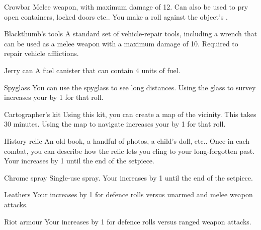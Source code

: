 \hr

\begin{describe}{Crowbar}
  Melee weapon, with maximum damage of 12. Can also be used to pry open containers, locked doors etc.. You make a \stat{\statPhysical} roll against the object's .
\end{describe}

\begin{describe}{Blackthumb's tools}
  A standard set of vehicle-repair tools, including a wrench that can be used as a melee weapon with a maximum damage of 10. Required to repair vehicle afflictions.
\end{describe}

\begin{describe}{Jerry can}
  A fuel canister that can contain 4 units of fuel.
\end{describe}

\begin{describe}{Spyglass}
  You can use the spyglass to see long distances. Using the glass to survey increases your \stat{\statMental} by 1 for that roll.
\end{describe}

\begin{describe}{Cartographer's kit}
  Using this kit, you can create a map of the vicinity. This takes 30 minutes. Using the map to navigate increases your \stat{\statMental} by 1 for that roll.
\end{describe}

\begin{describe}{History relic}
  An old book, a handful of photos, a child's doll, etc.. Once in each combat, you can describe how the relic lets you cling to your long-forgotten past. Your \stat{\statSkill} increases by 1 until the end of the setpiece.
\end{describe}

\begin{describe}{Chrome spray}
  Single-use spray. Your \stat{\statPhysical} increases by 1 until the end of the setpiece.
\end{describe}

\hr

\begin{describe}{Leathers}
  Your \stat{\statSkill} increases by 1 for defence rolls versus unarmed and melee weapon attacks.
\end{describe}

\begin{describe}{Riot armour}
  Your \stat{\statSkill} increases by 1 for defence rolls versus ranged weapon attacks.
\end{describe}
